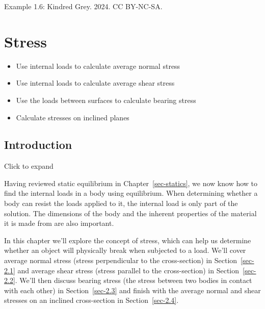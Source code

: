 \documentclass[
  letterpaper,
  DIV=11,
  numbers=noendperiod]{scrreprt}
\providecommand{\tightlist}{%
  \setlength{\itemsep}{0pt}\setlength{\parskip}{0pt}}\usepackage{longtable,booktabs,array}
\theoremstyle{definition}
\theoremstyle{remark}
\begin{document}
Example 1.6: Kindred Grey. 2024. CC BY-NC-SA.


\chapter{Stress}\label{sec-stress}

\begin{tcolorbox}[enhanced jigsaw, leftrule=.75mm, bottomrule=.15mm, opacityback=0, opacitybacktitle=0.6, colframe=quarto-callout-note-color-frame, toprule=.15mm, colbacktitle=quarto-callout-note-color!10!white, coltitle=black, bottomtitle=1mm, title={Learning Objectives}, titlerule=0mm, toptitle=1mm, colback=white, rightrule=.15mm, left=2mm, arc=.35mm, breakable]

\begin{itemize}
\tightlist
\item
  Use internal loads to calculate average normal stress
\item
  Use internal loads to calculate average shear stress
\item
  Use the loads between surfaces to calculate bearing stress
\item
  Calculate stresses on inclined planes
\end{itemize}

\end{tcolorbox}

\section*{Introduction}\label{introduction-1}


Click to expand

Having reviewed static equilibrium in Chapter~\ref{sec-statics}, we now
know how to find the internal loads in a body using equilibrium. When
determining whether a body can resist the loads applied to it, the
internal load is only part of the solution. The dimensions of the body
and the inherent properties of the material it is made from are also
important.

In this chapter we'll explore the concept of stress, which can help us
determine whether an object will physically break when subjected to a
load. We'll cover average normal stress (stress perpendicular to the
cross-section) in Section~\ref{sec-2.1} and average shear stress (stress
parallel to the cross-section) in Section~\ref{sec-2.2}. We'll then
discuss bearing stress (the stress between two bodies in contact with
each other) in Section~\ref{sec-2.3} and finish with the average normal
and shear stresses on an inclined cross-section in
Section~\ref{sec-2.4}.
\end{document}
